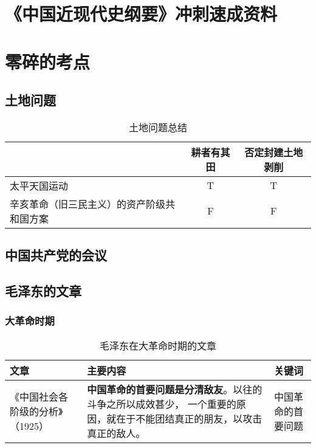 \documentclass[10pt, UTF8]{ctexbook} %
\begin{document}

\appendix
\newpage

\chapter{《中国近现代史纲要》冲刺速成资料}

\chapter{零碎的考点}

\section{土地问题}

\begin{table}[H]
    \centering
    \caption{土地问题总结}
    \begin{tabular}{p{} c c}
        \toprule
        & 耕者有其田 & 否定封建土地剥削 \\
        \midrule 
        \hline
        太平天国运动 & T & T \\
        辛亥革命（旧三民主义）的资产阶级共和国方案 & F & F \\
        \bottomrule
    \end{tabular}
\end{table}

\section{中国共产党的会议}

\section{毛泽东的文章}

\subsection{大革命时期}

\begin{table}[H]
    \centering
    \caption{毛泽东在大革命时期的文章}
    \begin{tabular}{p{}|p{}p{}}
        \hline 
        \textbf{文章} & \textbf{主要内容} & \textbf{关键词} \\
        \hline
        《中国社会各阶级的分析》（1925）&
        \textbf{中国革命的首要问题是分清敌友}。以往的斗争之所以成效甚少，
        一个重要的原因，就在于不能团结真正的朋友，以攻击真正的敌人。
        & 中国革命的首要问题 \\ 
        \hline
    \end{tabular}
\end{table}
\end{document}
